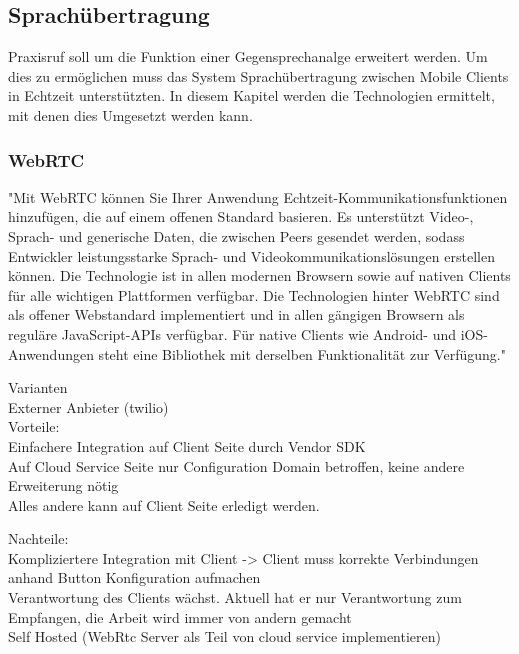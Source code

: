 \subsection{Sprachübertragung}

Praxisruf soll um die Funktion einer Gegensprechanalge erweitert werden.
Um dies zu ermöglichen muss das System Sprachübertragung zwischen Mobile Clients in Echtzeit unterstützten.
In diesem Kapitel werden die Technologien ermittelt, mit denen dies Umgesetzt werden kann.

\subsubsection{WebRTC}

"Mit WebRTC können Sie Ihrer Anwendung Echtzeit-Kommunikationsfunktionen hinzufügen, die auf einem offenen Standard basieren.
Es unterstützt Video-, Sprach- und generische Daten, die zwischen Peers gesendet werden, sodass Entwickler leistungsstarke Sprach- und Videokommunikationslösungen erstellen können.
Die Technologie ist in allen modernen Browsern sowie auf nativen Clients für alle wichtigen Plattformen verfügbar.
Die Technologien hinter WebRTC sind als offener Webstandard implementiert und in allen gängigen Browsern als reguläre JavaScript-APIs verfügbar.
Für native Clients wie Android- und iOS-Anwendungen steht eine Bibliothek mit derselben Funktionalität zur Verfügung."\cite{webrtc}


Varianten \\
Externer Anbieter (twilio) \\

Vorteile: \\

Einfachere Integration auf Client Seite durch Vendor SDK \\
Auf Cloud Service Seite nur Configuration Domain betroffen, keine andere Erweiterung nötig \\
Alles andere kann auf Client Seite erledigt werden.


Nachteile: \\
Kompliziertere Integration mit Client -> Client muss korrekte Verbindungen anhand Button Konfiguration aufmachen \\
Verantwortung des Clients wächst. Aktuell hat er nur Verantwortung zum Empfangen, die Arbeit wird immer von andern gemacht \\


Self Hosted (WebRtc Server als Teil von cloud service implementieren) \\

